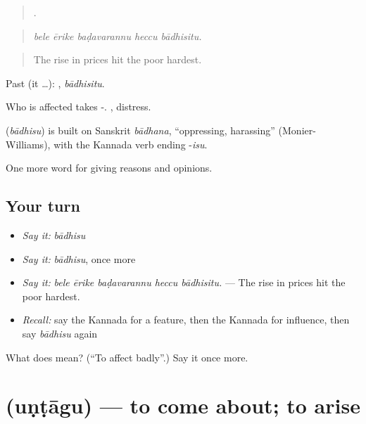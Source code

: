 \begin{quote}
    .
\end{quote}

\begin{quote}
\emph{bele ērike baḍavarannu heccu bādhisitu.}
\end{quote}

\begin{quote}
The rise in prices hit the poor hardest.
\end{quote}

Past (it …): , \emph{bādhisitu}.

Who is affected takes -. , distress.

\begin{cousinweb}
\textbf{} (\emph{bādhisu}) is built on Sanskrit \emph{bādhana}, \textquotedblleft{}oppressing, harassing\textquotedblright{} (Monier-Williams), with the Kannada verb ending -\emph{isu}.
\end{cousinweb}

\begin{grammarlens}[title={What you've built}]
One more word for giving reasons and opinions.
\end{grammarlens}

\subsection*{Your turn}
\begin{itemize}
\raggedright
  \item \emph{Say it:} \emph{bādhisu}
  \item \emph{Say it:} \emph{bādhisu}, once more
  \item \emph{Say it:} \emph{bele ērike baḍavarannu heccu bādhisitu.} — The rise in prices hit the poor hardest.
  \item \emph{Recall:} say the Kannada for a feature, then the Kannada for influence, then say \emph{bādhisu} again
\end{itemize}

\begin{tcolorbox}[breakable,colback=teal!4,colframe=teal!35!black,title={Before you move on}]
What does  mean? (\textquotedblleft{}To affect badly\textquotedblright{}.) Say it once more.
\end{tcolorbox}
\section[\texorpdfstring{\kn{ಉಂಟಾಗು} (uṇṭāgu)}{ಉಂಟಾಗು (uṇṭāgu)}]{ (uṇṭāgu) — to come about; to arise}


